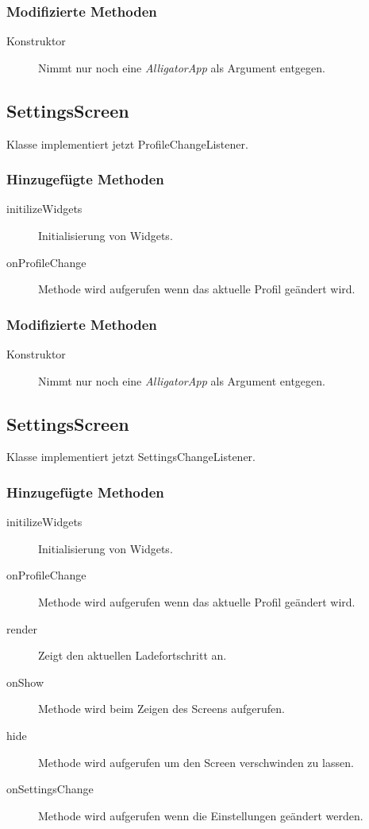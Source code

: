 \subsubsection{Modifizierte Methoden}
\begin{description}
\item[Konstruktor]
Nimmt nur noch eine \emph{AlligatorApp} als Argument entgegen.

\end{description}


\subsection{SettingsScreen}
Klasse implementiert jetzt ProfileChangeListener.
\subsubsection{Hinzugefügte Methoden}
\begin{description}
\item[initilizeWidgets]
Initialisierung von Widgets.
\item[onProfileChange]
Methode wird aufgerufen wenn das aktuelle Profil geändert wird.


\end{description}

\subsubsection{Modifizierte Methoden}
\begin{description}
\item[Konstruktor]
Nimmt nur noch eine \emph{AlligatorApp} als Argument entgegen.

\end{description}


\subsection{SettingsScreen}
Klasse implementiert jetzt SettingsChangeListener.
\subsubsection{Hinzugefügte Methoden}
\begin{description}
\item[initilizeWidgets]
Initialisierung von Widgets.
\item[onProfileChange]
Methode wird aufgerufen wenn das aktuelle Profil geändert wird.

\item[render]
Zeigt den aktuellen Ladefortschritt an.
\item[onShow]
Methode wird beim Zeigen des Screens aufgerufen.
\item[hide]
Methode wird aufgerufen um den Screen verschwinden zu lassen.
\item[onSettingsChange]
Methode wird aufgerufen wenn die Einstellungen geändert werden.


\end{description}


